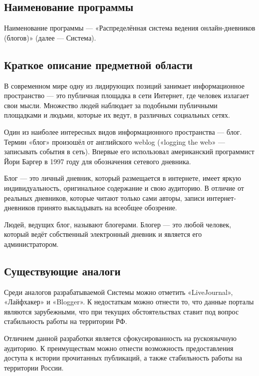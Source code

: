 \documentclass{bmstu-gost-7-32}
\begin{document}
\subsection{Наименование программы}

Наименование программы — «Распределённая система ведения онлайн-дневников (блогов)» (далее — Система).

\subsection{Краткое описание предметной области}

В современном мире одну из лидирующих позиций занимает информационное пространство — это публичная площадка в сети Интернет, где человек излагает свои мысли.
Множество людей наблюдает за подобными публичными площадками и людьми, которые их ведут, в различных социальных сетях.

Один из наиболее интересных видов информационного пространства — блог.
Термин «блог» произошёл от английского weblog («logging the web» — записывать события в сеть).
Впервые его использовал американский программист Йори Баргер в 1997 году для обозначения сетевого дневника.

Блог — это личный дневник, который размещается в интернете, имеет яркую индивидуальность, оригинальное содержание и свою аудиторию.
В отличие от реальных дневников, которые читают только сами авторы, записи интернет-дневников принято выкладывать на всеобщее обозрение.

Людей, ведущих блог, называют блогерами.
Блогер — это любой человек, который ведёт собственный электронный дневник и является его администратором.

\subsection{Существующие аналоги}

Среди аналогов разрабатываемой Системы можно отметить «LiveJournal», «Лайфхакер» и «Blogger».
К недостаткам можно отнести то, что данные порталы являются зарубежными, что при текущих обстоятельствах ставит под вопрос стабильность работы на территории РФ.

Отличием данной разработки является сфокусированность на рускоязычную аудиторию.
К преимуществам можно отнести возможность предоставления доступа к истории прочитанных публикаций, а также стабильность работы на территории России.
\end{document}
